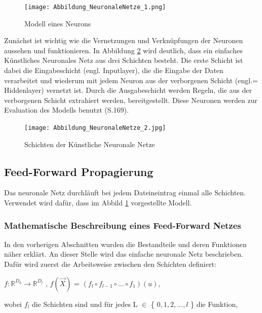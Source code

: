 \documentclass[12pt]{scrreprt}
\begin{document}
\begin{figure}[h!]
	\centering
	\texttt{[image: Abbildung\_NeuronaleNetze\_1.png]}
	\caption{Modell eines Neurons \cite{Abbildung2}}
	\label{fig:fig2}
\end{figure}
\newpage
	
Zunächst ist wichtig wie die Vernetzungen und Verknüpfungen der Neuronen aussehen und funktionieren. In Abbildung \ref{fig:fig3} wird deutlich, dass ein einfaches Künstliches Neuronales Netz aus drei Schichten besteht. Die erste Schicht ist dabei die Eingabeschicht (engl. Inputlayer), die die Eingabe der Daten verarbeitet und wiederum mit jedem Neuron aus der verborgenen Schicht (engl.= Hiddenlayer) vernetzt ist. Durch die Ausgabeschicht werden Regeln, die aus der verborgenen Schicht extrahiert werden, bereitgestellt. Diese Neuronen werden zur Evaluation des Modells benutzt \cite{Frochte2021}(S.169).
	
\begin{figure}[h!]
	\centering
	\texttt{[image: Abbildung\_NeuronaleNetze\_2.jpg]}
	\caption{Schichten der Künstliche Neuronale Netze \cite{Abbildung3}}
	\label{fig:fig3}
\end{figure}
	
\subsection{Feed-Forward Propagierung}

Das neuronale Netz durchläuft bei jedem Dateineintrag einmal alle Schichten. Verwendet wird dafür, dass im Abbild \ref{fig:fig2} vorgestellte Modell.

\subsubsection{Mathematische Beschreibung eines Feed-Forward Netzes}

In den vorherigen Abschnitten wurden die Bestandteile und deren Funktionen näher erklärt. An dieser Stelle wird das einfache neuronale Netz beschrieben. Dafür wird zuerst die Arbeitsweise zwischen den Schichten definiert:

\begin{center}
	$f: \mathbb{R}^{D_{0}} \to \mathbb{R}^{D_{l}}$ , $f(\overrightarrow{X})$ = $(f_{l} \circ f_{l-1} \circ ... \circ f_{1})(u)$,
\end{center}

wobei $f_{l}$ die Schichten sind und für jedes L $\in$ \{ $0, 1, 2, ..., l$ \} die Funktion,\\
\end{document}
